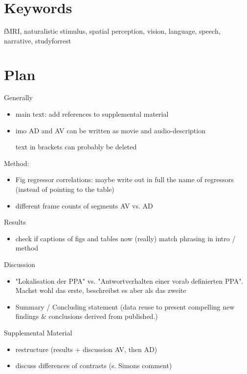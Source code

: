 \documentclass[english]{article}
\begin{document}
\section*{Keywords}
fMRI, naturalistic stimulus, spatial perception, vision, language, speech,
narrative, studyforrest

\pagebreak[4]

\section*{Plan}


\noindent Generally

\begin{itemize}
    \item main text: add references to supplemental material
    \item imo AD and AV can be written as movie and audio-description
    \item [text in brackets] can probably be deleted
\end{itemize}


\noindent Method:

\begin{itemize}
    \item Fig regressor correlations: maybe write out in full the name of
        regressors (instead of pointing to the table)
    \item different frame counts of segments AV vs. AD
\end{itemize}


\noindent Results

\begin{itemize}
    \item check if captions of figs and tables now (really) match phrasing
        in intro / method
\end{itemize}

\noindent Discussion
\begin{itemize}
    \item "Lokalisation der PPA" vs. "Antwortverhalten einer vorab definierten
        PPA". Machst wohl das erste, beschreibst es aber als das zweite
    \item Summary / Concluding statement
        (data reuse to present compelling new findings \& conclusions derived
        from published.)
\end{itemize}


\noindent Supplemental Material
\begin{itemize}
    \item restructure (results + discussion AV, then AD)
    \item discuss differences of contrasts (s. Simons comment)
\end{itemize}
\end{document}
